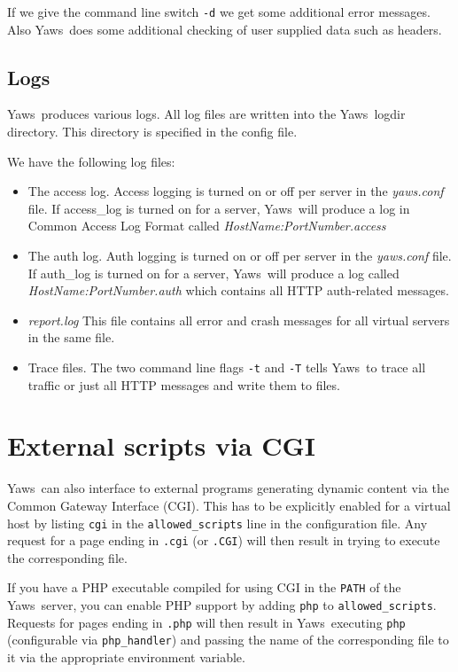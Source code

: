 \documentclass[11pt,oneside,english]{book}
\newcommand{\Yaws}            %
        {{\sc Yaws}}
\begin{document}
If we give the command line switch \verb+-d+ we get some additional
error messages. Also \Yaws\ does some additional checking of user
supplied data such as headers.

\section{Logs}
\Yaws\ produces various logs. All log files are written into the
\Yaws\ logdir directory. This directory is specified in the config
file.

We have the following log files:

\begin{itemize}
\item The access log. Access logging is turned on or off per server in
  the \textit{yaws.conf} file. If access\_log is turned on for a
  server, \Yaws\ will produce a log in Common Access Log Format called
  \textit{HostName:PortNumber.access}

\item The auth log. Auth logging is turned on or off per server in the
  \textit{yaws.conf} file. If auth\_log is turned on for a server,
  \Yaws\ will produce a log called \textit{HostName:PortNumber.auth}
  which contains all HTTP auth-related messages.

\item \textit{report.log} This file contains all error and crash
  messages for all virtual servers in the same file.

\item Trace files. The two command line flags \verb+-t+ and \verb+-T+ tells
\Yaws\ to trace all traffic or just all HTTP messages and write them to files.
\end{itemize}


\chapter{External scripts via CGI}

\Yaws\  can also interface to external programs generating dynamic
content via the Common Gateway Interface (CGI).  This has to be
explicitly enabled for a virtual host by listing \verb+cgi+ in the
\verb+allowed_scripts+ line in the configuration file.  Any request
for a page ending in \verb+.cgi+ (or \verb+.CGI+) will then result in
trying to execute the corresponding file.

If you have a PHP executable compiled for using CGI in the \verb+PATH+
of the \Yaws\  server, you can enable PHP support by adding \verb+php+ to
\verb+allowed_scripts+.  Requests for pages ending in \verb+.php+ will
then result in \Yaws\  executing \verb+php+ (configurable via
\verb+php_handler+) and passing the name of the corresponding file to
it via the appropriate environment variable.
\end{document}
